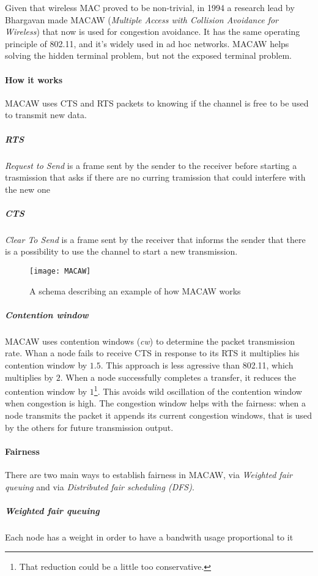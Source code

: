 Given that wireless MAC proved to be non-trivial, in 1994 a research lead by
Bhargavan made MACAW (\textit{Multiple Access with Collision Avoidance for
  Wireless}) that now is used for congestion avoidance. It has the same
operating principle of 802.11, and it's widely used in ad hoc networks.
MACAW helps solving the hidden terminal problem, but not the exposed terminal
problem.

\paragraph*{How it works} 
MACAW uses CTS and RTS packets to knowing if the channel is free to be used to
transmit new data.

\subparagraph*{RTS} \textit{Request to Send} is a frame sent by the
sender to the receiver before starting a trasmission that asks if there are no
curring tramission that could interfere with the new one

\subparagraph*{CTS} \textit{Clear To Send} is a frame sent by the receiver
that informs the sender that there is a possibility to use the channel to start
a new transmission.

\begin{figure}[t]
  \centering
  \texttt{[image: MACAW]}
  \caption{A schema describing an example of how MACAW works}
\end{figure}


\subparagraph*{Contention window} MACAW uses contention windows (\textit{cw}) to
determine the packet transmission rate. Whan a node fails to receive CTS in
response to its RTS it multiplies his contention window by $1.5$. This approach
is less agressive than 802.11, which multiplies by $2$. When a node successfully
completes a transfer, it reduces the contention window by $1$\footnote{That
  reduction could be a little too conservative.}. This avoids wild oscillation
of the contention window when congestion is high.
The congestion window helps with the fairness: when a node transmits the
packet it appends its current congestion windows, that is used by the others
for future transmission output.

\paragraph*{Fairness}
There are two main ways to establish fairness in MACAW, via \textit{Weighted fair queuing} and via \textit{Distributed fair scheduling (DFS)}.

\subparagraph*{Weighted fair queuing} Each node has a weight in order to have a bandwith usage proportional to it

